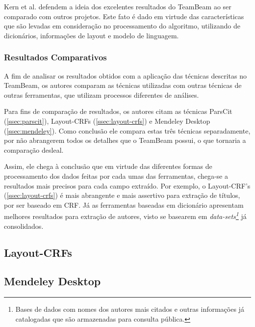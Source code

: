 Kern et al. defendem a ideia dos excelentes resultados do TeamBeam ao ser comparado com outros projetos. Este fato é dado em virtude das características que são levadas em consideração no processamento do algoritmo, utilizando de dicionários, informações de layout e modelo de linguagem.

\subsubsection{Resultados Comparativos}
\label{sssec:teambeam-comparative}

A fim de analisar os resultados obtidos com a aplicação das técnicas descritas no TeamBeam, os autores comparam as técnicas utilizadas com outras técnicas de outras ferramentas, que utilizam processos diferentes de análises.

Para fins de comparação de resultados, os autores citam as técnicas ParsCit (\autoref{ssec:parscit}), Layout-CRFs (\autoref{ssec:layout-crfs}) e Mendeley Desktop (\autoref{ssec:mendeley}). Como conclusão ele compara estas três técnicas separadamente, por não abrangerem todos os detalhes que o TeamBeam possui, o que tornaria a comparação desleal.

Assim, ele chega à conclusão que em virtude das diferentes formas de processamento dos dados feitas por cada umas das ferramentas, chega-se a resultados mais precisos para cada campo extraído. Por exemplo, o Layout-CRF's (\autoref{ssec:layout-crfs}) é mais abrangente e mais assertivo para extração de títulos, por ser baseado em CRF. Já as ferramentas baseadas em dicionário apresentam melhores resultados para extração de autores, visto se basearem em \textit{data-sets\footnote{Bases de dados com nomes dos autores mais citados e outras informações já catalogadas que são armazenadas para consulta pública.}} já consolidados.


\subsection{Layout-CRFs}
\label{ssec:layout-crfs}


\subsection{Mendeley Desktop}
\label{ssec:mendeley}

